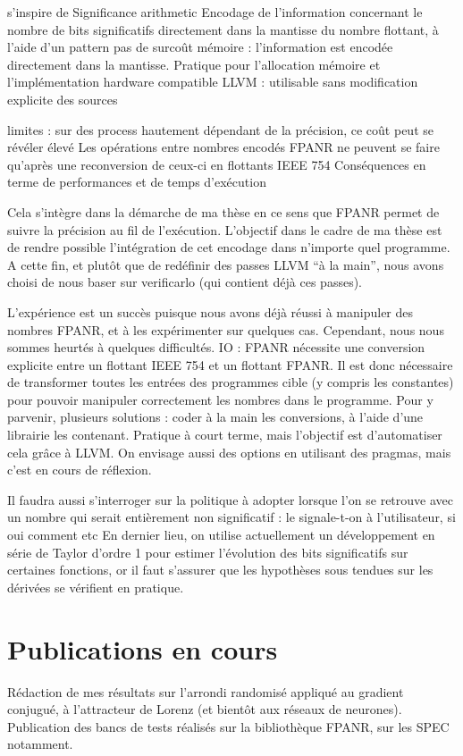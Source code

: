 \documentclass[a4paper,11pt]{article}
\begin{document}
s’inspire de Significance arithmetic
Encodage de l’information concernant  le nombre de bits significatifs directement dans la mantisse du nombre flottant, à l’aide d’un pattern
pas de surcoût mémoire : l’information est encodée directement dans la mantisse. Pratique pour l’allocation mémoire et l’implémentation hardware
compatible 
LLVM : utilisable sans modification explicite des sources

limites : sur des process hautement dépendant de la précision, ce coût peut se révéler élevé
Les opérations entre nombres encodés FPANR ne peuvent se faire qu’après une reconversion de ceux-ci en flottants IEEE 754
Conséquences en terme de performances et de temps d’exécution



Cela s’intègre dans la démarche de ma thèse en ce sens que FPANR permet de suivre la précision au fil de l’exécution.
L’objectif dans le cadre de ma thèse est de rendre possible l’intégration de cet encodage dans n’importe quel programme.
A cette fin, et plutôt que de redéfinir des passes LLVM “à la main”, nous avons choisi de nous baser sur verificarlo (qui contient déjà ces passes).

L’expérience est un succès puisque nous avons déjà réussi à manipuler des nombres FPANR, et à les expérimenter sur quelques cas.
Cependant, nous nous sommes heurtés à quelques difficultés.
IO : FPANR nécessite une conversion explicite entre un flottant IEEE 754 et un flottant FPANR. Il est donc nécessaire de transformer toutes les entrées des programmes cible (y compris les constantes) pour pouvoir manipuler correctement les nombres dans le programme. 
Pour y parvenir, plusieurs solutions : coder à la main les conversions, à l’aide d’une librairie les contenant. Pratique à court terme, mais l’objectif est d’automatiser cela grâce à LLVM.
On envisage aussi des options en utilisant des pragmas, mais c’est en cours de réflexion.

Il faudra aussi s’interroger sur la politique à adopter lorsque l’on se retrouve avec un nombre qui serait entièrement non significatif : le signale-t-on à l’utilisateur, si oui comment etc
En dernier lieu, on utilise actuellement un développement en série de Taylor d’ordre 1 pour estimer l’évolution des bits significatifs sur certaines fonctions, or il faut s’assurer que les hypothèses sous tendues sur les dérivées se vérifient en pratique.


\section{Publications en cours}
Rédaction de mes résultats sur l'arrondi randomisé appliqué au gradient conjugué, à l'attracteur de Lorenz (et bientôt aux réseaux de neurones).
Publication des bancs de tests réalisés sur la bibliothèque FPANR, sur les SPEC notamment. %
\end{document}
